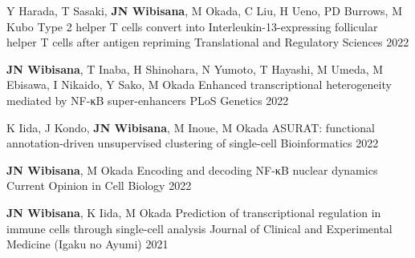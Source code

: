 



\begin{cventries}

  \cventrypub
    {Y Harada, T Sasaki, \textbf{JN Wibisana}, M Okada, C Liu, H Ueno, PD Burrows, M Kubo} %
    {Type 2 helper T cells convert into Interleukin-13-expressing follicular helper T cells after antigen repriming} %
    {Translational and Regulatory Sciences} %
    {2022} %


  \cventrypub
    {\textbf{JN Wibisana}, T Inaba, H Shinohara, N Yumoto, T Hayashi, M Umeda, M Ebisawa, I Nikaido, Y Sako, M Okada} %
    {Enhanced transcriptional heterogeneity mediated by NF-κB super-enhancers} %
    {PLoS Genetics} %
    {2022} %

  \cventrypublast
    {K Iida, J Kondo, \textbf{JN Wibisana}, M Inoue, M Okada} %
    {ASURAT: functional annotation-driven unsupervised clustering of single-cell} %
    {Bioinformatics} %
    {2022} %


\end{cventries}



\begin{cventries}

  \cventrypub
    {\textbf{JN Wibisana}, M Okada} %
    {Encoding and decoding NF-κB nuclear dynamics} %
    {Current Opinion in Cell Biology} %
    {2022} %

  \cventrypublast
    {\textbf{JN Wibisana}, K Iida, M Okada} %
    {Prediction of transcriptional regulation in immune cells through single-cell analysis} %
    {Journal of Clinical and Experimental Medicine (Igaku no Ayumi)} %
    {2021} %


\end{cventries}
  

